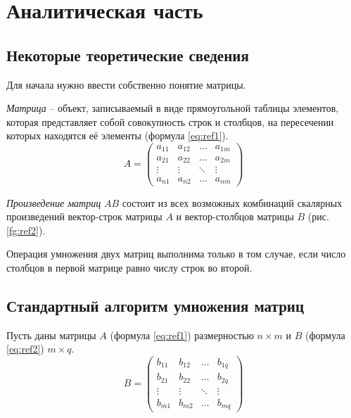 \chapter{Аналитическая часть}

\section{Некоторые теоретические сведения}

Для начала нужно ввести собственно понятие матрицы.

\textit{Матрица} -- объект, записываемый в виде прямоугольной таблицы элементов,
которая представляет собой совокупность строк и столбцов, на пересечении которых находятся её элементы (формула \ref{eq:ref1}).
\begin{equation}
	A = \left(
	\begin{array}{cccc}
			a_{11} & a_{12} & \ldots & a_{1m} \\
			a_{21} & a_{22} & \ldots & a_{2m} \\
			\vdots & \vdots & \ddots & \vdots \\
			a_{n1} & a_{n2} & \ldots & a_{nm}
		\end{array}
	\right)
	\label{eq:ref1}
\end{equation}

\textit{Произведение матриц} $AB$ состоит из всех возможных комбинаций скалярных произведений 
вектор-строк матрицы $A$ и вектор-столбцов матрицы $B$ (рис. \ref{fg:ref2}).
\begin{figure}[ht!]
\end{figure}

Операция умножения двух матриц выполнима только в том случае, если число столбцов в первой матрице равно числу строк во второй.

\section{Стандартный алгоритм умножения матриц}
Пусть даны матрицы $A$ (формула \ref{eq:ref1}) размерностью $n \times m$ и $B$ (формула \ref{eq:ref2}) $m \times q$.
\begin{equation}
	B = \left(
	\begin{array}{cccc}
			b_{11} & b_{12} & \ldots & b_{1q} \\
			b_{21} & b_{22} & \ldots & b_{2q} \\
			\vdots & \vdots & \ddots & \vdots \\
			b_{m1} & b_{m2} & \ldots & b_{mq}
		\end{array}
	\right)
	\label{eq:ref2}
\end{equation}

